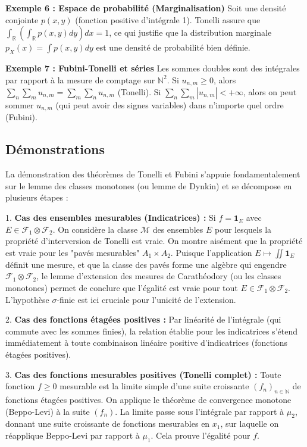 \documentclass[11pt,a4paper]{article}
\begin{document}
\textbf{Exemple 6 : Espace de probabilité (Marginalisation)}
Soit une densité conjointe $p(x,y)$ (fonction positive d'intégrale 1).
Tonelli assure que $\int_\mathbb{R} \left( \int_\mathbb{R} p(x,y) dy \right) dx = 1$, ce qui justifie que la distribution marginale $p_X(x) = \int p(x,y) dy$ est une densité de probabilité bien définie.

\textbf{Exemple 7 : Fubini-Tonelli et séries}
Les sommes doubles sont des intégrales par rapport \`a la mesure de comptage sur $\mathbb{N}^2$.
Si $u_{n,m} \ge 0$, alors $\sum_n \sum_m u_{n,m} = \sum_m \sum_n u_{n,m}$ (Tonelli).
Si $\sum_n \sum_m |u_{n,m}| < +\infty$, alors on peut sommer $u_{n,m}$ (qui peut avoir des signes variables) dans n'importe quel ordre (Fubini).

\subsection{Démonstrations}

La démonstration des théorèmes de Tonelli et Fubini s'appuie fondamentalement sur le lemme des classes monotones (ou lemme de Dynkin) et se décompose en plusieurs étapes :

1. \textbf{Cas des ensembles mesurables (Indicatrices) :}
   Si $f = \mathbf{1}_E$ avec $E \in \mathcal{F}_1 \otimes \mathcal{F}_2$. On considère la classe $\mathcal{M}$ des ensembles $E$ pour lesquels la propriété d'interversion de Tonelli est vraie. On montre aisément que la propriété est vraie pour les "pavés mesurables" $A_1 \times A_2$.
   Puisque l'application $E \mapsto \iint \mathbf{1}_E$ définit une mesure, et que la classe des pavés forme une algèbre qui engendre $\mathcal{F}_1 \otimes \mathcal{F}_2$, le lemme d'extension des mesures de Carathéodory (ou les classes monotones) permet de conclure que l'égalité est vraie pour tout $E \in \mathcal{F}_1 \otimes \mathcal{F}_2$. L'hypothèse $\sigma$-finie est ici cruciale pour l'unicité de l'extension.

2. \textbf{Cas des fonctions étagées positives :}
   Par linéarité de l'intégrale (qui commute avec les sommes finies), la relation établie pour les indicatrices s'étend immédiatement \`a toute combinaison linéaire positive d'indicatrices (fonctions étagées positives).

3. \textbf{Cas des fonctions mesurables positives (Tonelli complet) :}
   Toute fonction $f \ge 0$ mesurable est la limite simple d'une suite croissante $(f_n)_{n \in \mathbb{N}}$ de fonctions étagées positives.
   On applique le théorème de convergence monotone (Beppo-Levi) \`a la suite $(f_n)$. La limite passe sous l'intégrale par rapport \`a $\mu_2$, donnant une suite croissante de fonctions mesurables en $x_1$, sur laquelle on réapplique Beppo-Levi par rapport \`a $\mu_1$. Cela prouve l'égalité pour $f$.
\end{document}
